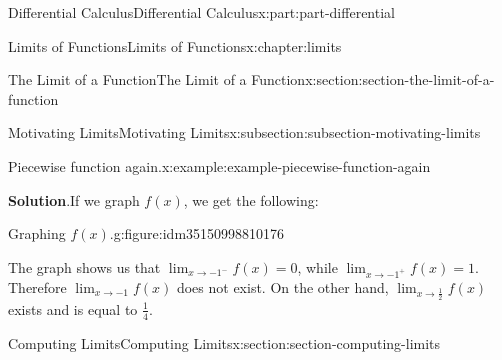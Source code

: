 \documentclass[twoside,10pt,]{book}
\newcommand{\blocktitlefont}{\relax}
\numberwithin{equation}{part}
\begin{document}
\begin{partptx}{Differential Calculus}{}{Differential Calculus}{}{}{x:part:part-differential}
\begin{chapterptx}{Limits of Functions}{}{Limits of Functions}{}{}{x:chapter:limits}
\begin{sectionptx}{The Limit of a Function}{}{The Limit of a Function}{}{}{x:section:section-the-limit-of-a-function}
\begin{subsectionptx}{Motivating Limits}{}{Motivating Limits}{}{}{x:subsection:subsection-motivating-limits}
\begin{example}{Piecewise function again.}{x:example:example-piecewise-function-again}
\par\smallskip%
\noindent\textbf{\blocktitlefont Solution}.\hypertarget{g:solution:idm35150998810944}{}\quad{}If we graph \(f(x)\), we get the following:%
\begin{figureptx}{Graphing \(f(x)\).}{g:figure:idm35150998810176}{}%
\begin{image}{0.25}{0.5}{0.25}%
%
\end{image}%
\tcblower
\end{figureptx}%
The graph shows us that \(\lim_{x\to-1^{-}}f(x) = 0\), while \(\lim_{x\to-1^{+}}f(x) = 1\). Therefore \(\lim_{x\to-1}f(x)\) does not exist. On the other hand, \(\lim_{x\to\frac{1}{2}}f(x)\) exists and is equal to \(\frac{1}{4}\).%
\end{example}
\end{subsectionptx}
\end{sectionptx}
%
%
\typeout{************************************************}
\typeout{************************************************}
%
\begin{sectionptx}{Computing Limits}{}{Computing Limits}{}{}{x:section:section-computing-limits}
\begin{introduction}{}%

\end{introduction}
\end{sectionptx}
\end{chapterptx}
\end{partptx}
\end{document}
